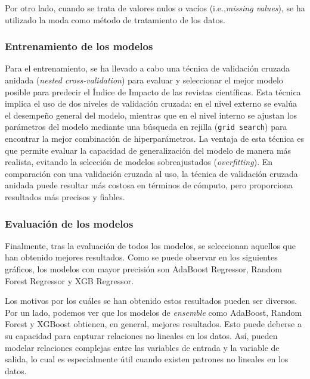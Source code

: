 
Por otro lado, cuando se trata de valores nulos o vacíos (i.e.,\textit{missing values}), se ha utilizado la moda como método de tratamiento de los datos.

\subsubsection{Entrenamiento de los modelos}
Para el entrenamiento, se ha llevado a cabo una técnica de validación cruzada anidada (\textit{nested cross-validation}) para evaluar y seleccionar el mejor modelo posible para predecir el Índice de Impacto de las revistas científicas. Esta técnica implica el uso de dos niveles de validación cruzada: en el nivel externo se evalúa el desempeño general del modelo, mientras que en el nivel interno se ajustan los parámetros del modelo mediante una búsqueda en rejilla (\texttt{grid search}) para encontrar la mejor combinación de hiperparámetros. La ventaja de esta técnica es que permite evaluar la capacidad de generalización del modelo de manera más realista, evitando la selección de modelos sobreajustados (\textit{overfitting}). En comparación con una validación cruzada al uso, la técnica de validación cruzada anidada puede resultar más costosa en términos de cómputo, pero proporciona resultados más precisos y fiables.


\subsubsection{Evaluación de los modelos}
Finalmente, tras la evaluación de todos los modelos, se seleccionan aquellos que han obtenido mejores resultados. Como se puede observar en los siguientes gráficos, los modelos con mayor precisión son AdaBoost Regressor, Random Forest Regressor y XGB Regressor.


Los motivos por los cuáles se han obtenido estos resultados pueden ser diversos. Por un lado, podemos ver que los modelos de \textit{ensemble} como AdaBoost, Random Forest y XGBoost obtienen, en general, mejores resultados. Esto puede deberse a su capacidad para capturar relaciones no lineales en los datos. Así, pueden modelar relaciones complejas entre las variables de entrada y la variable de salida, lo cual es especialmente útil cuando existen patrones no lineales en los datos. 

